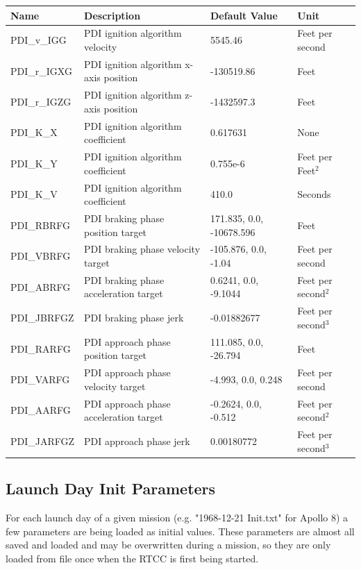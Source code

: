 \documentclass[11pt]{article} %
\begin{document}
\newpage
\begin{tabular}{L{3cm} L{7cm} L{2.5cm} L{1.5cm}}
\hline
\textbf{Name} & \textbf{Description} & \textbf{Default Value} & \textbf{Unit}\\
\hline
PDI\_v\_IGG & PDI ignition algorithm velocity & 5545.46 & Feet per second\\
\hline
PDI\_r\_IGXG & PDI ignition algorithm x-axis position & -130519.86 & Feet\\
\hline
PDI\_r\_IGZG & PDI ignition algorithm z-axis position & -1432597.3 & Feet\\
\hline
PDI\_K\_X & PDI ignition algorithm coefficient & 0.617631 & None\\
\hline
PDI\_K\_Y & PDI ignition algorithm coefficient & 0.755e-6 & Feet per Feet$^2$\\
\hline
PDI\_K\_V & PDI ignition algorithm coefficient & 410.0 & Seconds\\
\hline
PDI\_RBRFG & PDI braking phase position target & 171.835, 0.0, -10678.596 & Feet\\
\hline
PDI\_VBRFG & PDI braking phase velocity target & -105.876, 0.0, -1.04 & Feet per second\\
\hline
PDI\_ABRFG & PDI braking phase acceleration target & 0.6241, 0.0, -9.1044 & Feet per second$^2$\\
\hline
PDI\_JBRFGZ & PDI braking phase jerk & -0.01882677 & Feet per second$^3$\\
\hline
PDI\_RARFG & PDI approach phase position target & 111.085, 0.0, -26.794 & Feet\\
\hline
PDI\_VARFG & PDI approach phase velocity target & -4.993, 0.0, 0.248 & Feet per second\\
\hline
PDI\_AARFG & PDI approach phase acceleration target &  -0.2624, 0.0, -0.512 & Feet per second$^2$\\
\hline
PDI\_JARFGZ & PDI approach phase jerk & 0.00180772 & Feet per second$^3$\\
\hline
\end{tabular}

\newpage
\subsection{Launch Day Init Parameters}

For each launch day of a given mission (e.g. "1968-12-21 Init.txt" for Apollo 8) a few parameters are being loaded as initial values. These parameters are almost all saved and loaded and may be overwritten during a mission, so they are only loaded from file once when the RTCC is first being started.\\
\end{document}
